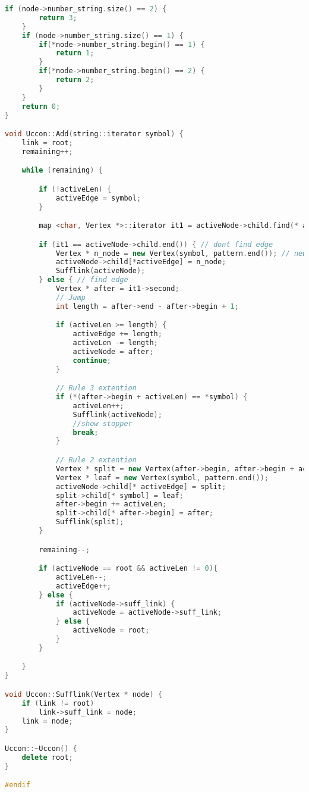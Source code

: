 \begin{lstlisting}[language=C++]
    if (node->number_string.size() == 2) {
        return 3;
    }
    if (node->number_string.size() == 1) {
        if(*node->number_string.begin() == 1) {
            return 1;
        }
        if(*node->number_string.begin() == 2) {
            return 2;
        }
    }
    return 0;
}

void Uccon::Add(string::iterator symbol) {
    link = root;
    remaining++;

    while (remaining) {

        if (!activeLen) {
            activeEdge = symbol;
        }

        map <char, Vertex *>::iterator it1 = activeNode->child.find(* activeEdge);

        if (it1 == activeNode->child.end()) { // dont find edge
            Vertex * n_node = new Vertex(symbol, pattern.end()); // new leaf
            activeNode->child[*activeEdge] = n_node;
            Sufflink(activeNode);
        } else { // find edge
            Vertex * after = it1->second;
            // Jump
            int length = after->end - after->begin + 1;

            if (activeLen >= length) {
                activeEdge += length;
                activeLen -= length;
                activeNode = after;
                continue;
            }

            // Rule 3 extention
            if (*(after->begin + activeLen) == *symbol) {
                activeLen++;
                Sufflink(activeNode);
                //show stopper
                break;
            }

            // Rule 2 extention
            Vertex * split = new Vertex(after->begin, after->begin + activeLen - 1);
            Vertex * leaf = new Vertex(symbol, pattern.end());
            activeNode->child[* activeEdge] = split;
            split->child[* symbol] = leaf;
            after->begin += activeLen;
            split->child[* after->begin] = after;
            Sufflink(split);
        }

        remaining--;

        if (activeNode == root && activeLen != 0){
            activeLen--;
            activeEdge++;
        } else {
            if (activeNode->suff_link) {
                activeNode = activeNode->suff_link;
            } else {
                activeNode = root;
            }
        }

    }
}

void Uccon::Sufflink(Vertex * node) {
    if (link != root)
        link->suff_link = node;
    link = node;
}

Uccon::~Uccon() {
    delete root;
}

#endif
\end{lstlisting}

